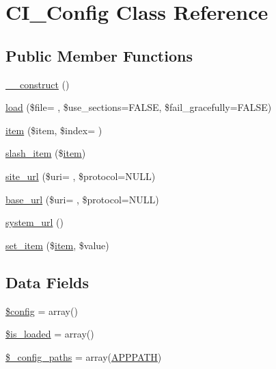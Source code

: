 \hypertarget{class_c_i___config}{}\section{C\+I\+\_\+\+Config Class Reference}
\label{class_c_i___config}
\subsection*{Public Member Functions}
\begin{DoxyCompactItemize}
\item 
\hyperlink{class_c_i___config_a095c5d389db211932136b53f25f39685}{\+\_\+\+\_\+construct} ()
\item 
\hyperlink{class_c_i___config_a0a60e9c6f42437ae6516365cde24f43d}{load} (\$file= \textquotesingle{}\textquotesingle{}, \$use\+\_\+sections=F\+A\+L\+S\+E, \$fail\+\_\+gracefully=F\+A\+L\+S\+E)
\item 
\hyperlink{class_c_i___config_accce7538d9763368e5955daf97d28f42}{item} (\$item, \$index= \textquotesingle{}\textquotesingle{})
\item 
\hyperlink{class_c_i___config_abead21ebddc51d12402b5320d531eb1f}{slash\+\_\+item} (\$\hyperlink{class_c_i___config_accce7538d9763368e5955daf97d28f42}{item})
\item 
\hyperlink{class_c_i___config_a27c522d1498342673d688ca8c66f97c8}{site\+\_\+url} (\$uri= \textquotesingle{}\textquotesingle{}, \$protocol=N\+U\+L\+L)
\item 
\hyperlink{class_c_i___config_a1241d7d7395d349f0c93237d71194771}{base\+\_\+url} (\$uri= \textquotesingle{}\textquotesingle{}, \$protocol=N\+U\+L\+L)
\item 
\hyperlink{class_c_i___config_a71e857f8dd38c230f1ce11bacf177ba8}{system\+\_\+url} ()
\item 
\hyperlink{class_c_i___config_a3cbd3bcacb546d42f5dd12213df48627}{set\+\_\+item} (\$\hyperlink{class_c_i___config_accce7538d9763368e5955daf97d28f42}{item}, \$value)
\end{DoxyCompactItemize}
\subsection*{Data Fields}
\begin{DoxyCompactItemize}
\item 
\hyperlink{class_c_i___config_a49c7011be9c979d9174c52a8b83e5d8e}{\$config} = array()
\item 
\hyperlink{class_c_i___config_a908e9ad52a5d1956d360689452f6bdbe}{\$is\+\_\+loaded} = array()
\item 
\hyperlink{class_c_i___config_a5f47dbd2111b5bb6c91ece69fefebf26}{\$\+\_\+config\+\_\+paths} = array(\hyperlink{_bootstrap_8php_a45cc636071e9edf22e5709d3c18bc84f}{A\+P\+P\+P\+A\+T\+H})
\end{DoxyCompactItemize}
